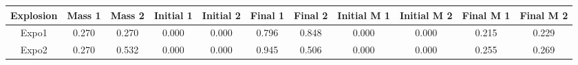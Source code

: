 \begin{table}[]
	\begin{tabular}{@{}ccccccccccc@{}}
		\toprule
		Explosion & Mass 1 & Mass 2 & Initial 1 & Initial 2 & Final 1 & Final 2 & Initial M 1 & Initial M 2 & Final M 1 & \cellcolor[HTML]{FFFFFF}Final M 2 \\ \midrule
		Expo1     & 0.270  & 0.270  & 0.000     & 0.000     & 0.796   & 0.848   & 0.000       & 0.000       & 0.215     & 0.229                             \\
		Expo2     & 0.270  & 0.532  & 0.000     & 0.000     & 0.945   & 0.506   & 0.000       & 0.000       & 0.255     & 0.269                             \\ \bottomrule
	\end{tabular}
\end{table}